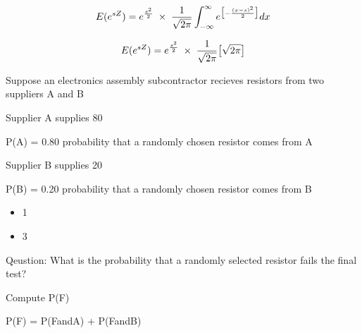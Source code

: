 \documentclass[12pt]{report}
\begin{document}
	
	
	\Large
	
	
	
	{
		\LARGE
		\[ E( e^{sZ} ) =  e^{{s^2\over 2}} \; \times\; \frac{1}{\sqrt{2\pi}} \int_{-\infty}^{\infty} e^{ \big[-\frac{(x-s)^2}{2} \big]} dx \]
		
		
		\[ E( e^{sZ} ) =  e^{{s^2\over 2}} \; \times\; \frac{1}{\sqrt{2\pi}} \big[\sqrt{2\pi} \big] \]
	}
	
	
	
	
	Suppose an electronics assembly subcontractor recieves resistors from two suppliers A and B
	
	Supplier A supplies 80%
	
	P(A) = 0.80 probability that a randomly chosen resistor comes from A
	
	Supplier B supplies 20%
	
	P(B) = 0.20 probability that a randomly chosen resistor comes from B
	
	
	
	\Large
	\begin{itemize}
		\item 1%
		\item 3%
	\end{itemize}
	
	
	
	Qeustion: What is the probability that a randomly selected resistor fails the final test?
	
	Compute P(F) 
	
	
	
	
	\Large
	P(F) = P(FandA) + P(FandB)
	
	
	











\end{document}

